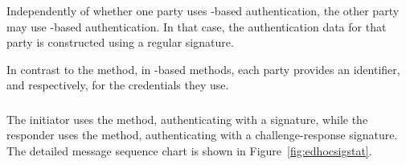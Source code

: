 Independently of whether one party uses \mStat{}-based authentication, the other party may use \mSig{}-based authentication. In that case, the authentication data for that party is constructed using a regular signature.
%

In contrast to the \mPskPsk{} method, in \mStat{}-based methods, each party provides an identifier, \mIdcredi{} and \mIdcredr{} respectively, for the credentials they use.
%
%

\spacehack
\subsubsection{\mSigStat}
The initiator uses the \mSig{} method, authenticating with a signature,
while the responder uses the \mStat{} method, authenticating with a
challenge-response signature.
%
The detailed message sequence chart is shown in Figure~\ref{fig:edhocsigstat}.
%

